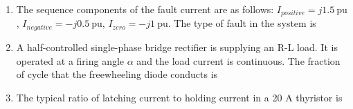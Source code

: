 \documentclass[journal,12pt,onecolumn]{IEEEtran}
\theoremstyle{remark}
\begin{document}
\begin{enumerate}[start=1, label=Q.\arabic*]
\begin{enumerate}
\end{enumerate}
\hfill{}

\item The sequence components of the fault current are as follows: $I_{positive}=j1.5~\text{pu}$, $I_{negative}=-j0.5~\text{pu}$, $I_{zero}=-j1~\text{pu}$. The type of fault in the system is

\begin{enumerate}
\end{enumerate}
\hfill{}

\item A half-controlled single-phase bridge rectifier is supplying an R-L load. It is operated at a firing angle $\alpha$ and the load current is continuous. The fraction of cycle that the freewheeling diode conducts is

\begin{enumerate}
\end{enumerate}
\hfill{}

\item The typical ratio of latching current to holding current in a 20 A thyristor is

\begin{enumerate}
\end{enumerate}
\hfill{}


\end{enumerate}
\end{document}

